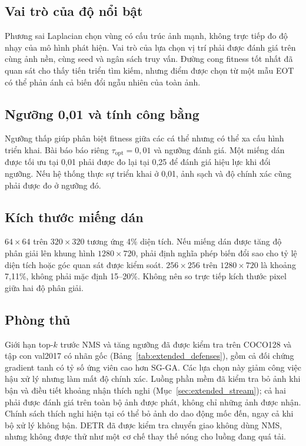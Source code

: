 \documentclass[a4paper,fleqn]{cas-dc}
\begin{document}
\subsection{Vai trò của độ nổi bật}

Phương sai Laplacian chọn vùng có cấu trúc ảnh mạnh, không trực tiếp đo độ nhạy của mô hình phát hiện. Vai trò của lựa chọn vị trí phải được đánh giá trên cùng ảnh nền, cùng seed và ngân sách truy vấn. Đường cong fitness tốt nhất đã quan sát cho thấy tiến triển tìm kiếm, nhưng điểm được chọn từ một mẫu EOT có thể phản ánh cả biến đổi ngẫu nhiên của toàn ảnh.

\subsection{Ngưỡng 0,01 và tính công bằng}

Ngưỡng thấp giúp phân biệt fitness giữa các cá thể nhưng có thể xa cấu hình triển khai. Bài báo báo riêng $\tau_{\mathrm{opt}}=0,01$ và ngưỡng đánh giá. Một miếng dán được tối ưu tại 0,01 phải được đo lại tại 0,25 để đánh giá hiệu lực khi đổi ngưỡng. Nếu hệ thống thực sự triển khai ở 0,01, ảnh sạch và độ chính xác cũng phải được đo ở ngưỡng đó.

\subsection{Kích thước miếng dán}

$64\times64$ trên $320\times320$ tương ứng 4\% diện tích. Nếu miếng dán được tăng độ phân giải lên khung hình $1280\times720$, phải định nghĩa phép biến đổi sao cho tỷ lệ diện tích hoặc góc quan sát được kiểm soát. $256\times256$ trên $1280\times720$ là khoảng 7,11\%, không phải mặc định 15--20\%. Không nên so trực tiếp kích thước pixel giữa hai độ phân giải.

\subsection{Phòng thủ}

Giới hạn top-$k$ trước NMS và tăng ngưỡng đã được kiểm tra trên COCO128 và tập con val2017 có nhãn gốc (Bảng~\ref{tab:extended_defenses}), gồm cả đối chứng gradient tanh có tỷ số ứng viên cao hơn SG-GA. Các lựa chọn này giảm công việc hậu xử lý nhưng làm mất độ chính xác. Luồng phần mềm đã kiểm tra bỏ ảnh khi bận và điều tiết khoảng nhận thích nghi (Mục~\ref{sec:extended_stream}); cả hai phải được đánh giá trên toàn bộ ảnh được phát, không chỉ những ảnh được nhận. Chính sách thích nghi hiện tại có thể bỏ ảnh do dao động mốc đến, ngay cả khi bộ xử lý không bận. DETR đã được kiểm tra chuyển giao không dùng NMS, nhưng không được thử như một cơ chế thay thế nóng cho luồng đang quá tải.
\end{document}
